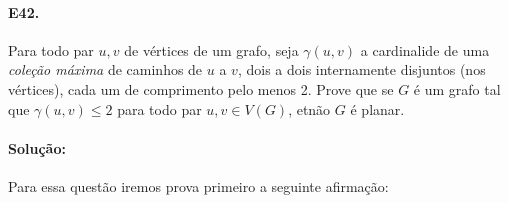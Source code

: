 \documentclass[11pt,a4paper,notitlepage]{exam}
\begin{document}
    \paragraph{E42.} Para todo par $u,v$ de vértices de um grafo, seja
    $\gamma(u,v)$ a cardinalide de uma \textit{coleção máxima} de
    caminhos de $u$ a $v$, dois a dois internamente disjuntos (nos
    vértices), cada um de comprimento pelo menos 2.\medskip\newline
    Prove que se $G$ é um grafo tal que $\gamma(u,v) \leq 2$ para todo
    par $u,v \in V(G)$, etnão $G$ é planar.

    \paragraph{Solução:}
    Para essa questão iremos prova primeiro a seguinte
    afirmação:
\end{document}
